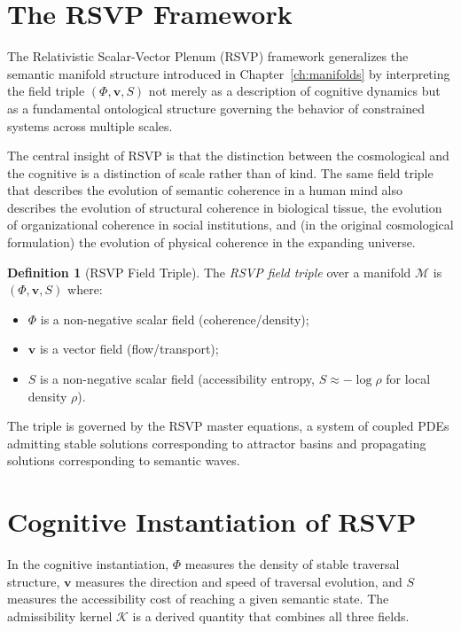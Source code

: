 \documentclass[12pt,oneside]{book}
\theoremstyle{plain}
\theoremstyle{definition}
\newtheorem{definition}[theorem]{Definition}
\theoremstyle{plain}
\newcommand{\cM}{\mathcal{M}}
\begin{document}
\section{The RSVP Framework}

The Relativistic Scalar-Vector Plenum (RSVP) framework generalizes the semantic manifold structure introduced in Chapter~\ref{ch:manifolds} by interpreting the field triple $(\Phi, \mathbf{v}, S)$ not merely as a description of cognitive dynamics but as a fundamental ontological structure governing the behavior of constrained systems across multiple scales.

The central insight of RSVP is that the distinction between the cosmological and the cognitive is a distinction of scale rather than of kind. The same field triple that describes the evolution of semantic coherence in a human mind also describes the evolution of structural coherence in biological tissue, the evolution of organizational coherence in social institutions, and (in the original cosmological formulation) the evolution of physical coherence in the expanding universe.

\begin{definition}[RSVP Field Triple]
The \emph{RSVP field triple} over a manifold $\cM$ is $(\Phi, \mathbf{v}, S)$ where:
\begin{itemize}[noitemsep]
\item $\Phi$ is a non-negative scalar field (coherence/density);
\item $\mathbf{v}$ is a vector field (flow/transport);
\item $S$ is a non-negative scalar field (accessibility entropy, $S \approx -\log \rho$ for local density $\rho$).
\end{itemize}
The triple is governed by the RSVP master equations, a system of coupled PDEs admitting stable solutions corresponding to attractor basins and propagating solutions corresponding to semantic waves.
\end{definition}

\section{Cognitive Instantiation of RSVP}

In the cognitive instantiation, $\Phi$ measures the density of stable traversal structure, $\mathbf{v}$ measures the direction and speed of traversal evolution, and $S$ measures the accessibility cost of reaching a given semantic state. The admissibility kernel $\mathcal{K}$ is a derived quantity that combines all three fields.
\end{document}
